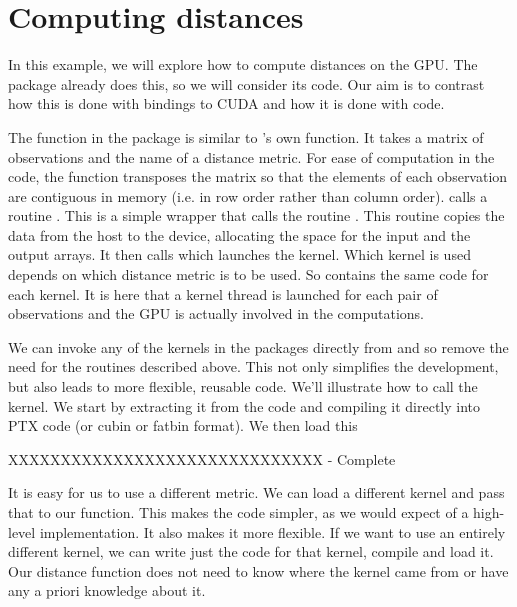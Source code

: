 \section{Computing distances}

In this example, we will explore how to compute distances on the GPU.
The  package already does this, so we will consider its
code.  Our aim is to contrast how this is done with \R{} bindings to
CUDA and how it is done with \C{} code.

The  function in the  package is similar
to \R's own  function.  It takes a matrix of observations
and the name of a distance metric.  For ease of computation in the
\C{} code, the function transposes the matrix so that the elements of
each observation are contiguous in memory (i.e. in row order rather
than column order).   calls a \C{} routine
.  This is a simple wrapper that calls the routine
.  This routine copies the data from the host to the
device, allocating the space for the input and the output arrays.  It
then calls  which launches the kernel.  Which
kernel is used depends on which distance metric is to be used.  So
 contains the same code for each kernel.  It is
here that a kernel thread is launched for each pair of observations
and the GPU is actually involved in the computations.


We can invoke any of the kernels in the  packages
directly from \R and so remove the need for the \C{} routines
described above. This not only simplifies the development, but also
leads to more flexible, reusable code.  We'll illustrate how to call
the  kernel.  We start by extracting it
from the \C{} code and compiling it directly into PTX code (or cubin
or fatbin format).
We then load this 


XXXXXXXXXXXXXXXXXXXXXXXXXXXXXX - Complete




It is easy for us to use a different metric.  We can load a different
kernel and pass that to our function.  This makes the code simpler, as
we would expect of a high-level implementation.  It also makes it more
flexible. If we want to use an entirely different kernel, we can write
just the code for that kernel, compile and load it.  Our distance
function does not need to know where the kernel came from or have any
a priori knowledge about it.

